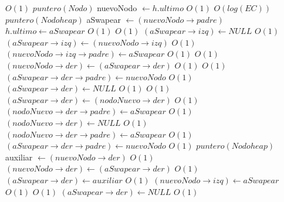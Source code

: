 \begin{Algoritmos}
\begin{algorithmic}[1]
		 \Comment $O(1)$
			\State $puntero(Nodo)$ nuevoNodo $\gets h.ultimo$			\Comment $O(1)$
			 \Comment $O(log(EC))$
				\State $puntero(Nodoheap)$ aSwapear $\gets (nuevoNodo \rightarrow padre)$
    			\State $h.ultimo \gets aSwapear$
    		\EndIf
			 \Comment $O(1)$
						 \Comment $O(1)$
								\State $(aSwapear \rightarrow izq) \gets NULL$ \Comment $O(1)$
							\Else
								\State $(aSwapear \rightarrow izq) \gets (nuevoNodo \rightarrow izq)$ \Comment $O(1)$
								\State $(nuevoNodo \rightarrow izq \rightarrow padre) \gets aSwapear$ \Comment $O(1)$
							\EndIf
							 \Comment $O(1)$
								\State $(nuevoNodo \rightarrow der) \gets (aSwapear \rightarrow der)$ \Comment $O(1)$
								 \Comment $O(1)$
								\State $(aSwapear \rightarrow der \rightarrow padre) \gets nuevoNodo$	 \Comment $O(1)$						
								\EndIf
								\State $(aSwapear \rightarrow der) \gets NULL$ \Comment $O(1)$
							\Else
								 \Comment $O(1)$
									\State $(aSwapear \rightarrow der) \gets (nodoNuevo \rightarrow der)$ \Comment $O(1)$
									\State $(nodoNuevo \rightarrow der \rightarrow padre) \gets aSwapear$ \Comment $O(1)$
									\State $(nodoNuevo \rightarrow der) \gets NULL$ \Comment $O(1)$
								\Else
									\State $(nodoNuevo \rightarrow der \rightarrow padre) \gets aSwapear$ \Comment $O(1)$
									\State $(aSwapear \rightarrow der \rightarrow padre) \gets nuevoNodo$ \Comment $O(1)$
									\State $puntero(Nodoheap)$ auxiliar $\gets (nuevoNodo \rightarrow der)$ \Comment $O(1)$
									\State $(nuevoNodo \rightarrow der) \gets (aSwapear \rightarrow der)$ \Comment $O(1)$
									\State $(aSwapear \rightarrow der) \gets auxiliar$ \Comment $O(1)$
								\EndIf
							\EndIf
						\State $(nuevoNodo \rightarrow izq) \gets aSwapear$ \Comment $O(1)$
					\Else
						 \Comment $O(1)$
								\State $(aSwapear \rightarrow der) \gets NULL$ \Comment $O(1)$

\end{algorithmic}
\end{Algoritmos}
